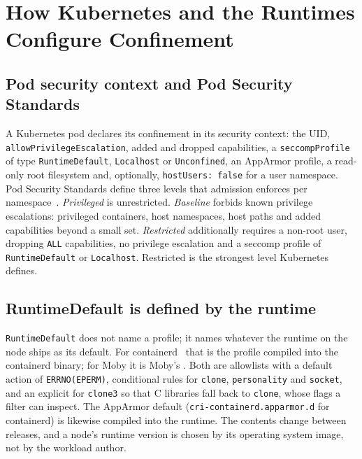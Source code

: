 \section{How Kubernetes and the Runtimes Configure Confinement}

\subsection{Pod security context and Pod Security Standards}
A Kubernetes pod declares its confinement in its security context: the UID, \texttt{allowPrivilegeEscalation}, added and dropped capabilities, a \texttt{seccompProfile} of type \texttt{RuntimeDefault}, \texttt{Localhost} or \texttt{Unconfined}, an AppArmor profile, a read-only root filesystem and, optionally, \texttt{hostUsers: false} for a user namespace. Pod Security Standards define three levels that admission enforces per namespace~\cite{pss}. \emph{Privileged} is unrestricted. \emph{Baseline} forbids known privilege escalations: privileged containers, host namespaces, host paths and added capabilities beyond a small set. \emph{Restricted} additionally requires a non-root user, dropping \texttt{ALL} capabilities, no privilege escalation and a seccomp profile of \texttt{RuntimeDefault} or \texttt{Localhost}. Restricted is the strongest level Kubernetes defines.

\subsection{RuntimeDefault is defined by the runtime}
\texttt{RuntimeDefault} does not name a profile; it names whatever the runtime on the node ships as its default. For containerd~\cite{containerd} that is the profile compiled into the containerd binary; for Moby it is Moby's . Both are allowlists with a default action of \texttt{ERRNO(EPERM)}, conditional rules for \texttt{clone}, \texttt{personality} and \texttt{socket}, and an explicit  for \texttt{clone3} so that C libraries fall back to \texttt{clone}, whose flags a filter can inspect. The AppArmor default (\texttt{cri-containerd.apparmor.d} for containerd) is likewise compiled into the runtime. The contents change between releases, and a node's runtime version is chosen by its operating system image, not by the workload author.


